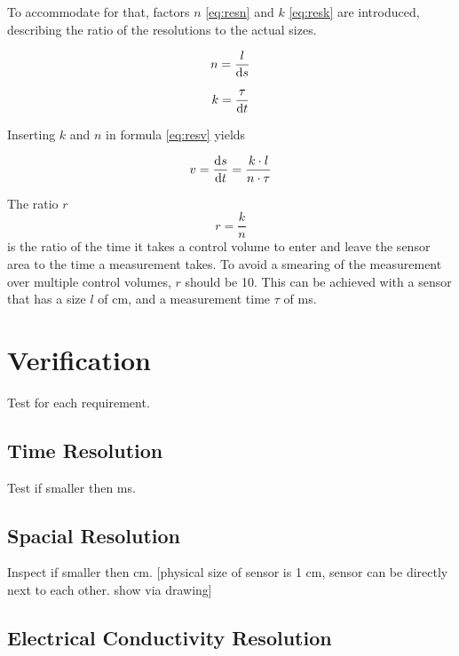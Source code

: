 To accommodate for that, factors $ n $ \eqref{eq:resn} and $ k $ \eqref{eq:resk} are introduced, describing the ratio of the resolutions to the actual sizes.

\begin{equation}
	n = \dfrac{l}{\mathop{}\!\mathrm{d} s}
\label{eq:resn} 
\end{equation}

\begin{equation}
	k = \dfrac{ \tau}{\mathop{}\!\mathrm{d} t}
\label{eq:resk}
\end{equation}

Inserting $ k $ and $ n $ in formula \eqref{eq:resv} yields

\begin{equation}
	v = \dfrac{\mathop{}\!\mathrm{d} s}{\mathop{}\!\mathrm{d} t} = \dfrac{k \cdot l}{n \cdot \tau}
\label{eq:resv1} 
\end{equation}

The ratio $ r $
\begin{equation}
	r = \frac{k}{n}
\label{eq:resr} 
\end{equation}
is the ratio of the time it takes a control volume to enter and leave the sensor area  to the time a measurement takes. To avoid a smearing of the measurement over multiple control volumes, $ r $ should be 10. This can be achieved with a sensor that has a size $ l $ of \unit[1]{cm}, and a measurement time $ \tau $ of \unit[1]{ms}.

\section{Verification}

Test for each requirement.

\subsection{Time Resolution}

Test if smaller then \unit[1]{ms}.

\subsection{Spacial Resolution}

Inspect if smaller then \unit[1]{cm}. [physical size of sensor is 1 cm, sensor can be directly next to each other. show via drawing]

\subsection{Electrical Conductivity Resolution}

